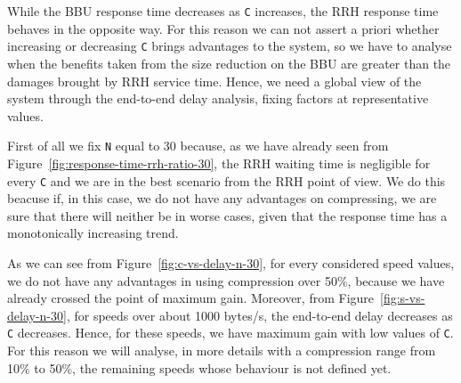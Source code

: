 \documentclass[11pt,a4paper,oneside, openright]{article}
\begin{document}
While the BBU response time decreases as \texttt{C} increases, the RRH response time behaves in the opposite way. For this reason we can not assert a priori whether increasing or decreasing \texttt{C} brings advantages to the system, so we have to analyse when the benefits taken from the size reduction on the BBU are greater than the damages brought by RRH service time. Hence, we need a global view of the system through the end-to-end delay analysis, fixing factors at representative values.

First of all we fix \texttt{N} equal to 30 because, as we have already seen from Figure~\ref{fig:response-time-rrh-ratio-30}, the RRH waiting time is negligible for every \texttt{C} and we are in the best scenario from the RRH point of view. We do this beacuse if, in this case, we do not have any advantages on compressing, we are sure that there will neither be in worse cases, given that the response time has a monotonically increasing trend.


As we can see from Figure~\ref{fig:c-vs-delay-n-30}, for every considered speed values, we do not have any advantages in using compression over 50\%, because we have already crossed the point of maximum gain. 
Moreover, from Figure~\ref{fig:s-vs-delay-n-30}, for speeds over about 1000 bytes/s, the end-to-end delay decreases as \texttt{C} decreases. Hence, for these speeds, we have maximum gain with low values of \texttt{C}. For this reason we will analyse, in more details with a compression range from 10\% to 50\%, the remaining speeds whose behaviour is not defined yet.
\end{document}
